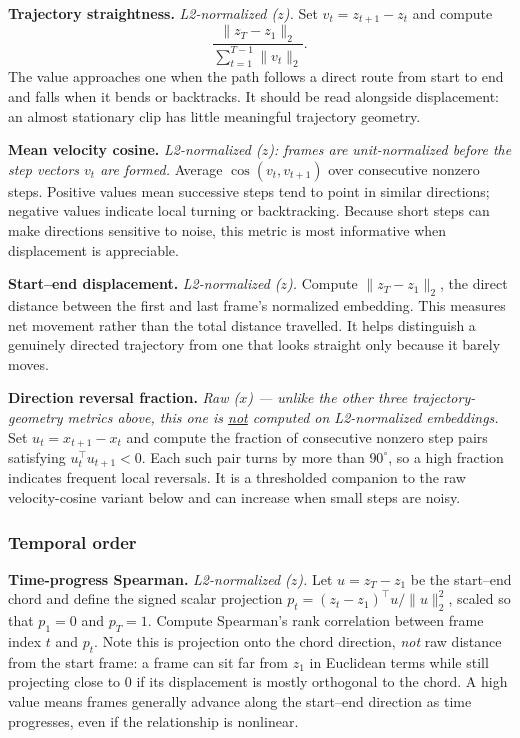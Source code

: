 \noindent\textbf{Trajectory straightness.} \emph{L2-normalized ($z$).} Set
$v_t=z_{t+1}-z_t$ and compute
\[
    \frac{\|z_T-z_1\|_2}
         {\sum_{t=1}^{T-1}\|v_t\|_2}.
\]
The value approaches one when the path follows a direct route from
start to end and falls when it bends or backtracks. It should be read
alongside displacement: an almost stationary clip has little meaningful
trajectory geometry.

\noindent\textbf{Mean velocity cosine.} \emph{L2-normalized ($z$): frames are
unit-normalized before the step vectors $v_t$ are formed.} Average $\cos(v_t,v_{t+1})$
over consecutive nonzero steps. Positive values mean successive steps tend to point in
similar directions; negative values indicate local turning or backtracking. Because
short steps can make directions sensitive to noise, this metric is most informative
when displacement is appreciable.

\noindent\textbf{Start--end displacement.} \emph{L2-normalized ($z$).} Compute
$\|z_T-z_1\|_2$, the direct distance between the first and last frame's normalized
embedding. This measures net movement rather than the total distance travelled. It
helps distinguish a genuinely directed trajectory from one that looks straight only
because it barely moves.

\noindent\textbf{Direction reversal fraction.} \emph{Raw ($x$) --- unlike the other
three trajectory-geometry metrics above, this one is \underline{not} computed on
L2-normalized embeddings.} Set $u_t=x_{t+1}-x_t$ and compute the fraction of consecutive
nonzero step pairs satisfying $u_t^\top u_{t+1}<0$. Each such pair turns by more than
$90^\circ$, so a high fraction indicates frequent local reversals. It is a thresholded
companion to the raw velocity-cosine variant below and can increase when small steps are
noisy.

\subsubsection{Temporal order}

\noindent\textbf{Time-progress Spearman.} \emph{L2-normalized ($z$).} Let
$u=z_T-z_1$ be the start--end chord and define the signed scalar projection
$p_t=(z_t-z_1)^\top u/\|u\|_2^2$, scaled so that $p_1=0$ and $p_T=1$. Compute Spearman's
rank correlation between frame index $t$ and $p_t$. Note this is projection onto the
chord direction, \emph{not} raw distance from the start frame: a frame can sit far from
$z_1$ in Euclidean terms while still projecting close to $0$ if its displacement is
mostly orthogonal to the chord. A high value means frames generally advance along the
start--end direction as time progresses, even if the relationship is nonlinear.

